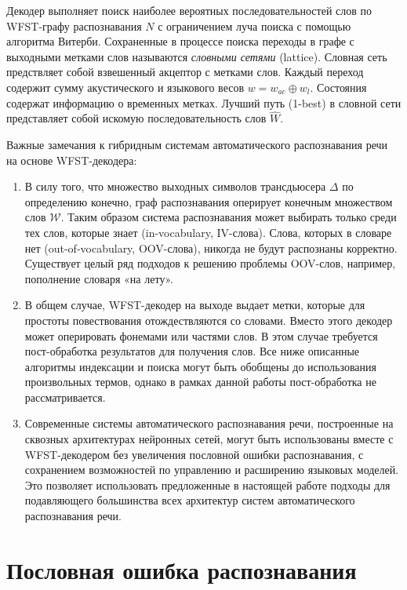 Декодер выполняет поиск наиболее вероятных последовательностей слов по WFST-графу распознавания $N$ с ограничением луча поиска с помощью алгоритма Витерби. Сохраненные в процессе поиска переходы в графе с выходными метками слов называются \textit{словными сетями} (lattice). Словная сеть предствляет собой взвешенный акцептор с метками слов. Каждый переход содержит сумму акустического и языкового весов $w = w_{ac} \oplus w_{l}$. Состояния содержат информацию о временных метках. Лучший путь (1-best) в словной сети представляет собой искомую последовательность слов $\hat{W}$.

Важные замечания к гибридным системам автоматического распознавания речи на основе WFST-декодера:

\begin{enumerate}
  \item В силу того, что множество выходных символов трансдьюсера $\Delta$ по определению конечно, граф распознавания оперирует конечным множеством слов $\mathcal{W}$. Таким образом система распознавания может выбирать только среди тех слов, которые знает (in-vocabulary, IV-слова). Слова, которых в словаре нет (out-of-vocabulary, OOV-слова), никогда не будут распознаны корректно. Существует целый ряд подходов к решению проблемы OOV-слов, например, пополнение словаря «на лету».
  \item В общем случае, WFST-декодер на выходе выдает метки, которые для простоты повествования отождествляются со словами. Вместо этого декодер может оперировать фонемами или частями слов. В этом случае требуется пост-обработка результатов для получения слов. Все ниже описанные алгоритмы индексации и поиска могут быть обобщены до использования произвольных термов, однако в рамках данной работы пост-обработка не рассматривается.
  \item Современные системы автоматического распознавания речи, построенные на сквозных архитектурах нейронных сетей, могут быть использованы вместе с WFST-декодером без увеличения пословной ошибки распознавания, с сохранением возможностей по управлению и расширению языковых моделей. Это позволяет использовать предложенные в настоящей работе подходы для подавляющего большинства всех архитектур систем автоматического распознавания речи.
\end{enumerate}


\section{Пословная ошибка распознавания}\label{sec:ch1/wer}

